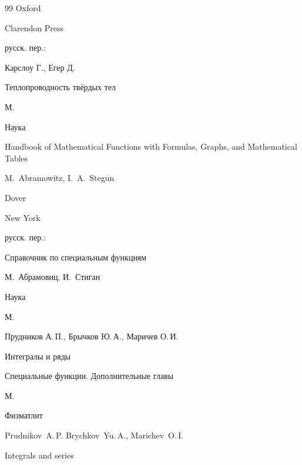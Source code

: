 \begin{thebibliography}{99}
\publaddr Oxford

\publ Clarendon Press



\rtransl русск. пер.:~

\by Карслоу Г., Егер Д.

\book Теплопроводность твёрдых тел 

\publaddr М.

\publ Наука






\book Handbook of Mathematical Functions with Formulas, Graphs, and Mathematical Tables


\eds M.~Abramowitz, I.~A.~Stegun

\publ Dover

\publaddr New York


\rtransl

русск. пер.:~

\book Справочник по специальным функциям


\eds М.~Абрамовиц, И.~Стиган

\publ Наука

\publaddr М.






\by Прудников А.\,П., Брычков Ю.\,А., Маричев О.\,И. 

\book Интегралы и ряды


\volinfo Специальные функции. Дополнительные главы 

\publaddr М.

\publ Физматлит



\misctransl

\by Prudnikov~A.\,P. Brychkov~Yu.\,A., Marichev~O.\,I.

\book Integrals and series


\end{thebibliography}
